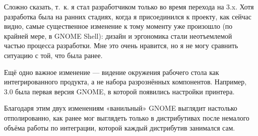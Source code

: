 \documentclass[10pt, a5paper]{article}
\begin{document}
\begin{Parallel}[p]{}{}
{\a Сложно сказать, т.~к. я стал разработчиком только во время перехода на 3.x. Хотя разработка была на ранних стадиях, когда я присоединился к проекту, как сейчас видно, самые существенное изменение к тому моменту уже произошло (по крайней мере, в GNOME Shell): дизайн и эргономика стали неотъемлемой частью процесса разработки. Мне это очень нравится, но я не могу сравнить ситуацию с той, что была ранее.

Ещё одно важное изменение — видение окружения рабочего стола как интегрированного продукта, а не набора разрознённых компонентов. Например, 3.0 была первая версия GNOME, в которой появились настройки принтера.

Благодаря этим двух изменениям «ванильный» GNOME выглядит настолько {\color{red} отполированно}, как ранее мог выглядеть только в дистрибутивах после немалого объёма работы по интеграции, которой каждый дистрибутив занимался сам.

     }
   \end{Parallel}









 
\end{document}
